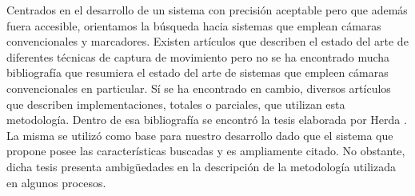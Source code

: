 Centrados en el desarrollo de un sistema con precisión aceptable pero que además fuera accesible, orientamos la búsqueda hacia sistemas que emplean cámaras convencionales y marcadores. Existen artículos que describen el estado del arte de diferentes técnicas de captura de movimiento pero no se ha encontrado mucha bibliografía que resumiera el estado del arte de sistemas que empleen cámaras convencionales en particular. Sí se ha encontrado en cambio, diversos artículos que describen implementaciones, totales o parciales, que utilizan esta metodología. Dentro de esa bibliografía se encontró la tesis elaborada por Herda  \cite{herda}. La misma se utilizó como base para nuestro desarrollo dado que el sistema que propone posee las características buscadas y es ampliamente citado. No obstante, dicha tesis presenta ambigüedades en la descripción de la metodología utilizada en algunos procesos.\\
